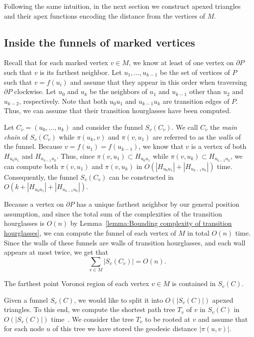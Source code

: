 \documentclass[a4paper,UKenglish]{lipics}
\newcommand{\fn}[2]{\ensuremath{S_{\scriptscriptstyle #1}(#2)}}
\newcommand{\ff}[1]{\ensuremath{f(#1)}}
\newcommand{\g}[2]{\ensuremath{|\pi(#1, #2)|}}
\newcommand{\p}[2]{\ensuremath{\pi(#1, #2)}}
\begin{document}
Following the same intuition, in the next section we construct apexed triangles and their apex functions encoding the distance from the vertices of $M$.

\subsection{Inside the funnels of marked vertices}
Recall that for each marked vertex $v\in M$, we know at least of one vertex on $\partial P$ such that $v$ is its farthest neighbor.
Let $u_1, \ldots, u_{k-1}$ be the set of vertices of $P$ such that $v = \ff{u_i}$ and assume that they appear in this order when traversing $\partial P$ clockwise. Let $u_0$ and $u_k$ be the neighbors of $u_1$ and $u_{k-1}$ other than $u_2$ and $u_{k-2}$, respectively. Note that both $u_0 u_1$ and $u_{k-1}u_k$ are transition edges of $P$. Thus, we can assume that their transition hourglasses have been computed.

Let $C_v = (u_0, \ldots, u_k)$ and consider the funnel $\fn{v}{C_v}$.
We call $C_v$ the \emph{main chain} of $\fn{v}{C_v}$ while $\p{u_k}{ v}$ and $\p{v}{ u_1}$ are referred to as the \emph{walls} of the funnel.  
Because $v = \ff{u_1} = \ff{u_{k-1}}$, we know that $v$ is a vertex of both $H_{u_0 u_1}$ and  $H_{u_{k-1}u_k}$. 
Thus, since $\p{v}{ u_1}\subset H_{u_0u_1}$ while $\p{v}{u_k}\subset H_{u_{k-1}u_k}$, we can compute both $\p{v}{ u_1}$ and $\p{v}{u_k}$ in $O( |H_{u_0 u_1}| + |H_{u_{k-1}u_k}|)$ time.
Consequently, the funnel $\fn{v}{C_v}$ can be constructed in $O(k + |H_{u_0 u_1}| + |H_{u_{k-1}u_k}|)$. 

Because a vertex on $\partial P$ has a unique farthest neighbor by our general position assumption, and since the total sum of the complexities of the transition hourglasses is $O(n)$ by Lemma~\ref{lemma:Bounding complexity of transition hourglasses}, we can compute the funnel of each vertex of $M$ in total $O(n)$ time. 
Since the walls of these funnels are walls of transition hourglasses, and each wall appears at most twice, we get that $$\sum_{v\in M} |\fn{v}{C_v}|  = O(n).$$

\begin{lemma}
The farthest point Voronoi region of each vertex $v\in M$ is contained in $\fn{v}{C}$.
\end{lemma}

Given a funnel $\fn{v}{C}$, we would like to split it into $O(|\fn{v}{C}|)$ apexed triangles. 
To this end, we compute the shortest path tree $T_v$ of $v$ in $\fn{v}{C}$ in $O(|\fn{v}{C}|)$ time~\cite{guibasShortestPathQueries}.
We consider the tree $T_v$ to be rooted at $v$ and assume that for each node $u$ of this tree 
we have stored the geodesic distance $\g{u}{v}$. 
\end{document}
